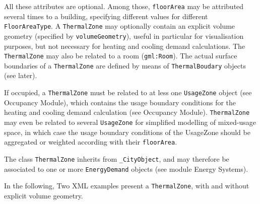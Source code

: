 \documentclass[a4paper,12pt]{article}
\begin{document}
All these attributes are optional. Among those, \texttt{floorArea} may
be attributed several times to a building, specifying different values
for different \texttt{FloorAreaType}. A \texttt{ThermalZone} may
optionally contain an explicit volume geometry (specified by
\texttt{volumeGeometry}), useful in particular for visualisation
purposes, but not necessary for heating and cooling demand calculations.
The \texttt{ThermalZone} may also be related to a room
(\texttt{gml:Room}). The actual surface boundaries of a
\texttt{ThermalZone} are defined by means of \texttt{ThermalBoudary}
objects (see later).

If occupied, a \texttt{ThermalZone} must be related to at less one
\texttt{UsageZone} object (see Occupancy Module), which contains the
usage boundary conditions for the heating and cooling demand calculation
(see Occupancy Module). \texttt{ThermalZone} may even be related to
several \texttt{UsageZone} for simplified modelling of mixed-usage
space, in which case the usage boundary conditions of the UsageZone
should be aggregated or weighted according with their
\texttt{floorArea}.

The class \texttt{ThermalZone} inherits from \texttt{\_CityObject}, and
may therefore be associated to one or more \texttt{EnergyDemand} objects
(see module Energy Systems).

In the following, Two XML examples present a \texttt{ThermalZone}, with
and without explicit volume geometry.
\end{document}
